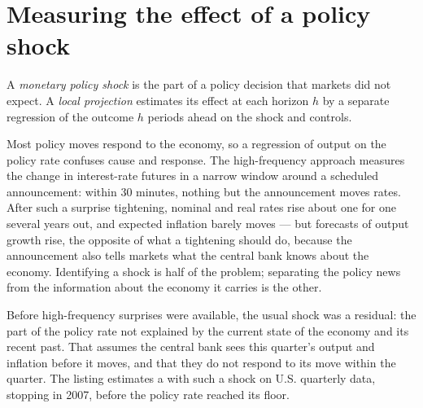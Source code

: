 \section{Measuring the effect of a policy shock}\label{sec:b3:central-banking:shocks}

\begin{definition}\label{def:b3:central-banking:shock}
A \emph{monetary policy shock} is the part of a policy decision that markets did not
expect. A \emph{local projection} estimates its effect at each horizon $h$ by a
separate regression of the outcome $h$ periods ahead on the shock and controls.
\end{definition}

Most policy moves respond to the economy, so a regression of output on the policy
rate confuses cause and response. The high-frequency approach measures the change
in interest-rate futures in a narrow window around a scheduled announcement:
within 30 minutes, nothing but the announcement moves rates. After such a surprise
tightening, nominal and real rates rise about one for one several years out, and
expected inflation barely moves --- but forecasts of output growth rise, the
opposite of what a tightening should do, because the announcement also tells
markets what the central bank knows about the economy. %
Identifying a shock is half of the problem; separating the policy news from the
information about the economy it carries is the other.

Before high-frequency surprises were available, the usual shock was a residual: the
part of the policy rate not explained by the current state of the economy and its
recent past. That assumes the central bank sees this quarter's output and inflation
before it moves, and that they do not respond to its move within the quarter. The
listing estimates a  with such a shock on U.S. quarterly data,
stopping in 2007, before the policy rate reached its floor.

\label{lst:b3:central-banking:lp}

\label{out:b3:central-banking:lp}

